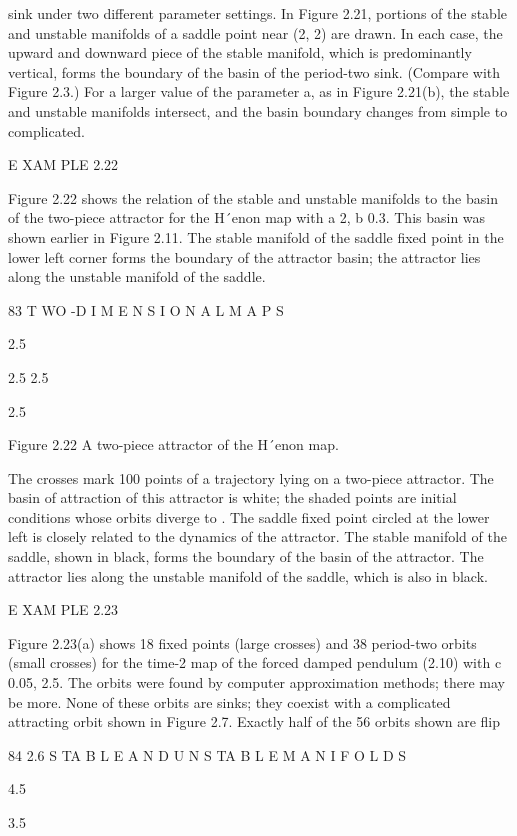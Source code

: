 \documentclass[12pt]{article}
\begin{document}
sink under two different parameter settings. In Figure 2.21, portions of the stable and unstable manifolds of a saddle point near (2, 
2) are drawn. In each case, the upward and downward piece of the stable manifold, which is predominantly vertical, forms the boundary 
of the basin of the period-two sink. (Compare with Figure 2.3.) For a larger value of the parameter a, as in Figure 2.21(b), the 
stable and unstable manifolds intersect, and the basin boundary changes from simple to complicated.

E XAM PLE 2.22

Figure 2.22 shows the relation of the stable and unstable manifolds to the basin of the two-piece attractor for the H´enon map with a  
2, b  0.3. This basin was shown earlier in Figure 2.11. The stable manifold of the saddle ﬁxed point in the lower left corner forms 
the boundary of the attractor basin; the attractor lies along the unstable manifold of the saddle.

83 T WO -D I M E N S I O N A L M A P S

2.5

2.5 2.5

2.5

Figure 2.22 A two-piece attractor of the H´enon map.

The crosses mark 100 points of a trajectory lying on a two-piece attractor. The basin of attraction of this attractor is white; the 
shaded points are initial conditions whose orbits diverge to . The saddle ﬁxed point circled at the lower left is closely related to 
the dynamics of the attractor. The stable manifold of the saddle, shown in black, forms the boundary of the basin of the attractor. 
The attractor lies along the unstable manifold of the saddle, which is also in black.

E XAM PLE 2.23

Figure 2.23(a) shows 18 ﬁxed points (large crosses) and 38 period-two orbits (small crosses) for the time-2  map of the forced 
damped pendulum (2.10) with c  0.05, 
  2.5. The orbits were found by computer approximation methods; there may be more. None of these orbits are sinks; they coexist with 
a complicated attracting orbit shown in Figure 2.7. Exactly half of the 56 orbits shown are ﬂip

84 2.6 S TA B L E A N D U N S TA B L E M A N I F O L D S

4.5

3.5  



 
\end{document}
